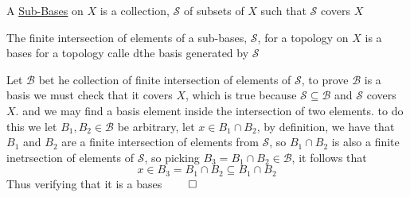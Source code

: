 \begin{definition}
    A \href{https://en.wikipedia.org/wiki/Subbase}{Sub-Bases} on $X$ is a collection, $\mathscr{S}$ of subsets of $X$ such that $\mathscr{S}$ covers $X$
\end{definition}
\begin{lemma}
    The finite intersection of elements of a sub-bases, $\mathscr{S}$, for a topology on $X$ is a bases for a topology calle dthe basis generated by $\mathscr{S}$
\end{lemma}
Let $\mathscr{B}$ bet he collection of finite intersection of elements of $\mathscr{S}$, to prove $\mathscr{B}$ is a basis we must check that it covers $X$, which is true because $\mathscr{S}\subseteq\mathscr{B}$ and $\mathscr{S}$ covers $X$. and we may find a basis element inside the intersection of two elements. to do this we let $B_1,B_2\in\mathscr{B}$ be arbitrary, let $x\in B_1\cap B_2$, by definition, we have that $B_1$ and $B_2$ are a finite intersection of elements from $\mathscr{S}$, so $B_1\cap B_2$ is also a finite inetrsection of elements of $\mathscr{S}$, so picking $B_3=B_1\cap B_2\in\mathscr{B}$, it follows that
\[x\in B_3= B_1\cap B_2\subseteq B_1\cap B_2\]
Thus verifying that it is a bases $\qed$

